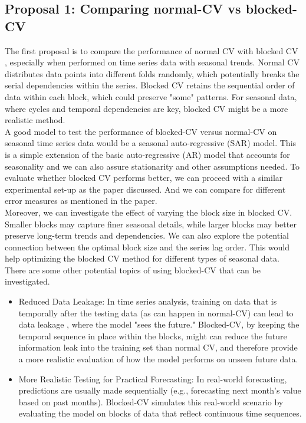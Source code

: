 \documentclass[12pt, oneside]{amsart}
\theoremstyle{definition}
\theoremstyle{remark}
\numberwithin{equation}{section}
\begin{document}
\subsection{Proposal 1: Comparing normal-CV vs blocked-CV} %
The first proposal is to compare the performance of normal CV with blocked CV \citep{Bergmeir2014}, especially when performed on time series data with seasonal trends. Normal CV distributes data points into different folds randomly, which potentially breaks the serial dependencies within the series. Blocked CV retains the sequential order of data within each block, which could preserve "some" patterns. For seasonal data, where cycles and temporal dependencies are key, blocked CV might be a more realistic method.\\

A good model to test the performance of blocked-CV versus normal-CV on seasonal time series data would be a seasonal auto-regressive (SAR) model. This is a simple extension of the basic auto-regressive (AR) model that accounts for seasonality and we can also assure stationarity and other assumptions needed. To evaluate whether blocked CV performs better, we can proceed with a similar experimental set-up as the paper discussed. And we can compare for different error measures as mentioned in the paper. \\

Moreover, we can investigate the effect of varying the block size in blocked CV. Smaller blocks may capture finer seasonal details, while larger blocks may better preserve long-term trends and dependencies. We can also explore the potential connection between the optimal block size and the series lag order. This would help optimizing the blocked CV method for different types of seasonal data. There are some other potential topics of using blocked-CV that can be investigated.
\begin{itemize}
    \item Reduced Data Leakage: In time series analysis, training on data that is temporally after the testing data (as can happen in normal-CV) can lead to data leakage \citep{Shao}, where the model "sees the future." Blocked-CV, by keeping the temporal sequence in place within the blocks, might can reduce the future information leak into the training set than normal CV, and therefore provide a more realistic evaluation of how the model performs on unseen future data.
    \item More Realistic Testing for Practical Forecasting: In real-world forecasting, predictions are usually made sequentially (e.g., forecasting next month's value based on past months). Blocked-CV simulates this real-world scenario by evaluating the model on blocks of data that reflect continuous time sequences. 


\end{itemize}
\end{document}
